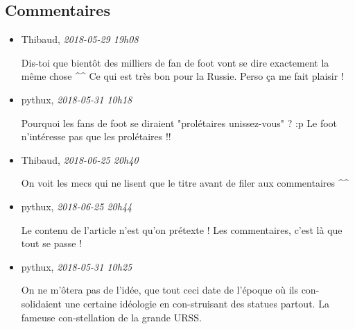 \documentclass[]{article}
\date{}
\begin{document}
\hypertarget{commentaires}{%
\subsection{Commentaires}\label{commentaires}}

\begin{itemize}
\item
  Thibaud, \emph{2018-05-29 19h08}

  Dis-toi que bientôt des milliers de fan de foot vont se dire
  exactement la même chose \^{}\^{} Ce qui est très bon pour la Russie.
  Perso ça me fait plaisir !
\item
  pythux, \emph{2018-05-31 10h18}

  Pourquoi les fans de foot se diraient "prolétaires unissez-vous" ? :p
  Le foot n'intéresse pas que les prolétaires !!
\item
  Thibaud, \emph{2018-06-25 20h40}

  On voit les mecs qui ne lisent que le titre avant de filer aux
  commentaires \^{}\^{}
\item
  pythux, \emph{2018-06-25 20h44}

  Le contenu de l'article n'est qu'on prétexte ! Les commentaires, c'est
  là que tout se passe !
\item
  pythux, \emph{2018-05-31 10h25}

  On ne m'ôtera pas de l'idée, que tout ceci date de l'époque où ils
  con-solidaient une certaine idéologie en con-struisant des statues
  partout. La fameuse con-stellation de la grande URSS.
\end{itemize}
\end{document}
